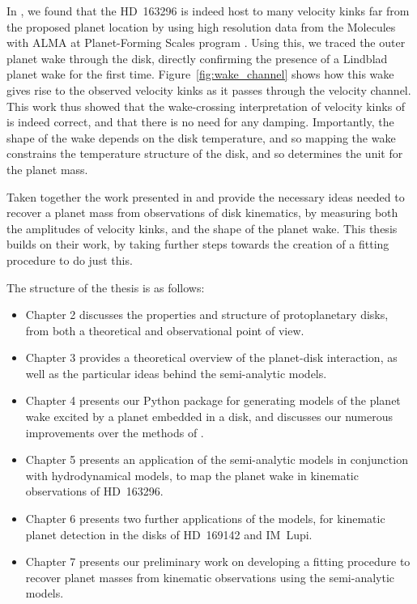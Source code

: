In \citet{calcino2022}, we found that the HD~163296 is indeed host to many velocity kinks far from the proposed planet location by using high resolution data from the Molecules with ALMA at Planet-Forming Scales program \citep[MAPS;][]{oberg2021}.
Using this, we traced the outer planet wake through the disk, directly confirming the presence of a Lindblad planet wake for the first time.
Figure~\ref{fig:wake_channel} shows how this wake gives rise to the observed velocity kinks as it passes through the velocity channel.
This work thus showed that the wake-crossing interpretation of velocity kinks of \citet{bollati2021a} is indeed correct, and that there is no need for any damping.
Importantly, the shape of the wake depends on the disk temperature, and so mapping the wake constrains the temperature structure of the disk, and so determines the unit for the planet mass.

Taken together the work presented in \citet{bollati2021a} and \citet{calcino2022} provide the necessary ideas needed to recover a planet mass from observations of disk kinematics, by measuring both the amplitudes of velocity kinks, and the shape of the planet wake.
This thesis builds on their work, by taking further steps towards the creation of a fitting procedure to do just this.

The structure of the thesis is as follows:
\begin{itemize}
    \item Chapter 2 discusses the properties and structure of protoplanetary disks, from both a theoretical and observational point of view.
    \item Chapter 3 provides a theoretical overview of the planet-disk interaction, as well as the particular ideas behind the semi-analytic models.
    \item Chapter 4 presents our Python package for generating models of the planet wake excited by a planet embedded in a disk, and discusses our numerous improvements over the methods of \citet{bollati2021a}.
    \item Chapter 5 presents an application of the semi-analytic models in conjunction with hydrodynamical models, to map the planet wake in kinematic observations of HD~163296.
    \item Chapter 6 presents two further applications of the models, for kinematic planet detection in the disks of HD~169142 and IM~Lupi.
    \item Chapter 7 presents our preliminary work on developing a fitting procedure to recover planet masses from kinematic observations using the semi-analytic models.
\end{itemize}

